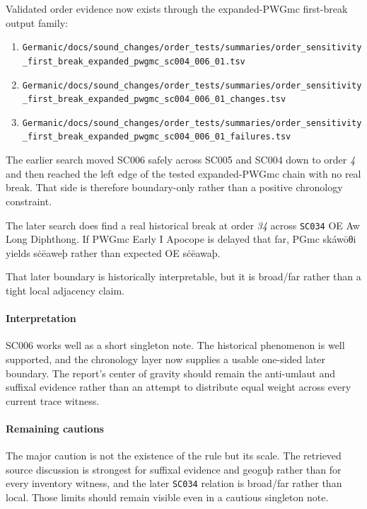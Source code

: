 \documentclass[
  british,
  a4paper,
]{article}
\providecommand{\tightlist}{%
  \setlength{\itemsep}{0pt}\setlength{\parskip}{0pt}}
\begin{document}
Validated order evidence now exists through the expanded-PWGmc
first-break output family:

\begin{enumerate}
\def\labelenumi{\arabic{enumi}.}
\tightlist
\item
  \texttt{Germanic/docs/sound\_changes/order\_tests/summaries/order\_sensitivity\_first\_break\_expanded\_pwgmc\_sc004\_006\_01.tsv}
\item
  \texttt{Germanic/docs/sound\_changes/order\_tests/summaries/order\_sensitivity\_first\_break\_expanded\_pwgmc\_sc004\_006\_01\_changes.tsv}
\item
  \texttt{Germanic/docs/sound\_changes/order\_tests/summaries/order\_sensitivity\_first\_break\_expanded\_pwgmc\_sc004\_006\_01\_failures.tsv}
\end{enumerate}

The earlier search moved SC006 safely across SC005 and SC004 down to
order \emph{4} and then reached the left edge of the tested
expanded-PWGmc chain with no real break. That side is therefore
boundary-only rather than a positive chronology constraint.

The later search does find a real historical break at order \emph{34}
across \texttt{SC034} OE Aw Long Diphthong. If PWGmc Early I Apocope is
delayed that far, PGmc skáwōθi yields sċēaweþ rather than expected OE
sċēawaþ.

That later boundary is historically interpretable, but it is broad/far
rather than a tight local adjacency claim.

\paragraph{Interpretation}\label{interpretation-3}

SC006 works well as a short singleton note. The historical phenomenon is
well supported, and the chronology layer now supplies a usable one-sided
later boundary. The report's center of gravity should remain the
anti-umlaut and suffixal evidence rather than an attempt to distribute
equal weight across every current trace witness.

\paragraph{Remaining cautions}\label{remaining-cautions-3}

The major caution is not the existence of the rule but its scale. The
retrieved source discussion is strongest for suffixal evidence and
geoguþ rather than for every inventory witness, and the later
\texttt{SC034} relation is broad/far rather than local. Those limits
should remain visible even in a cautious singleton note.
\end{document}

